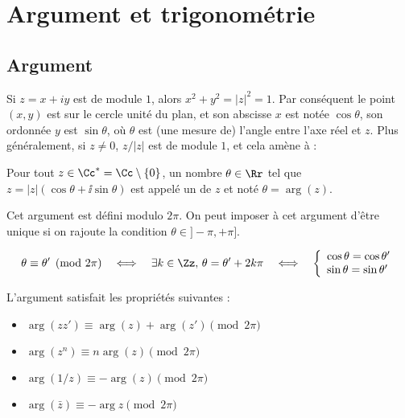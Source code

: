 \documentclass[class=report,crop=false]{standalone}
\begin{document}
\section{Argument et trigonométrie}

\subsection{Argument}

Si $z=x+iy$ est de module $1$, alors $x^2+y^2=|z|^2=1$. Par conséquent le point $(x,y)$ est sur le cercle unité du plan,
et son abscisse $x$ est notée $\cos \theta$, son ordonnée $y$ est $\sin \theta$, où $\theta$ est
(une mesure de) l'angle entre l'axe réel et $z$. Plus généralement, si $z\neq 0$, $z/|z|$ est de module $1$, et cela amène à :

\begin{definition}
  Pour tout $z \in \Cc^{\ast} =\Cc \setminus \left\{ 0 \right\}$,
  un nombre $\theta \in \Rr$ tel que $z = \left| z
  \right|  \left( \cos \theta + \ii  \sin \theta \right)$ est appelé un 
  de $z$ et noté $\theta = \arg (z)$.
\end{definition}



Cet argument est défini modulo $2\pi$. On peut imposer à cet argument d'être unique si on
rajoute la condition $\theta \in]-\pi,+\pi]$.

\begin{remarque*}
  \[ \theta \equiv \theta' \pmod {2\pi}\quad  \Longleftrightarrow \quad  \exists k \in
     \Zz, \, \theta = \theta' + 2 k \pi \quad  \Longleftrightarrow \quad
     \left\{ \begin{array}{l}
       \cos \theta = \cos \theta'\\
       \sin \theta = \sin \theta'
     \end{array} \right. \]
\end{remarque*}


\begin{proposition}
  L'argument satisfait les propriétés suivantes :
  \begin{itemize}
    \item $\arg \left( zz' \right) \equiv \arg (z) + \arg \left(
    z' \right) \pmod {2\pi}$

    \item $\arg \left( z^n \right) \equiv n \arg (z) \pmod {2\pi}$

    \item $\arg \left( 1 / z \right) \equiv - \arg (z) \pmod {2\pi}$

    \item $\arg (\bar{z}) \equiv - \arg z \pmod{2 \pi}$
  \end{itemize}
\end{proposition}
\end{document}
